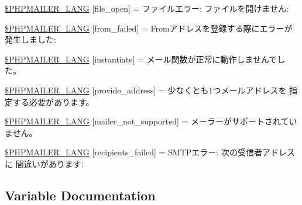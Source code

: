 \begin{DoxyCompactItemize}
\item 
\hyperlink{phpmailer_8lang-ja_8php_a28d1a6517bf4c942a0ddd506188ad2e0}{\$\+P\+H\+P\+M\+A\+I\+L\+E\+R\+\_\+\+L\+A\+NG} \mbox{[}\textquotesingle{}file\+\_\+open\textquotesingle{}\mbox{]} = \textquotesingle{}ファイルエラー\+: ファイルを開けません\+: \textquotesingle{}
\item 
\hyperlink{phpmailer_8lang-ja_8php_adf832ae12155a09be077c6d5e4fd7e22}{\$\+P\+H\+P\+M\+A\+I\+L\+E\+R\+\_\+\+L\+A\+NG} \mbox{[}\textquotesingle{}from\+\_\+failed\textquotesingle{}\mbox{]} = \textquotesingle{}Fromアドレスを登録する際にエラーが発生しました\+: \textquotesingle{}
\item 
\hyperlink{phpmailer_8lang-ja_8php_ad58dde16780f4770ccf4dd282ea1f5ad}{\$\+P\+H\+P\+M\+A\+I\+L\+E\+R\+\_\+\+L\+A\+NG} \mbox{[}\textquotesingle{}instantiate\textquotesingle{}\mbox{]} = \textquotesingle{}メール関数が正常に動作しませんでした。\textquotesingle{}
\item 
\hyperlink{phpmailer_8lang-ja_8php_a8b97897c2406b7392b056f375feeefbb}{\$\+P\+H\+P\+M\+A\+I\+L\+E\+R\+\_\+\+L\+A\+NG} \mbox{[}\textquotesingle{}provide\+\_\+address\textquotesingle{}\mbox{]} = \textquotesingle{}少なくとも1つメールアドレスを 指定する必要があります。\textquotesingle{}
\item 
\hyperlink{phpmailer_8lang-ja_8php_aa2ebcb8833ee83a7ad67401c4bb3a6ad}{\$\+P\+H\+P\+M\+A\+I\+L\+E\+R\+\_\+\+L\+A\+NG} \mbox{[}\textquotesingle{}mailer\+\_\+not\+\_\+supported\textquotesingle{}\mbox{]} = \textquotesingle{} メーラーがサポートされていません。\textquotesingle{}
\item 
\hyperlink{phpmailer_8lang-ja_8php_a7589d30bb9b368327c2df015f3e6bcba}{\$\+P\+H\+P\+M\+A\+I\+L\+E\+R\+\_\+\+L\+A\+NG} \mbox{[}\textquotesingle{}recipients\+\_\+failed\textquotesingle{}\mbox{]} = \textquotesingle{}S\+M\+T\+Pエラー\+: 次の受信者アドレスに 間違いがあります\+: \textquotesingle{}
\end{DoxyCompactItemize}


\subsection{Variable Documentation}
